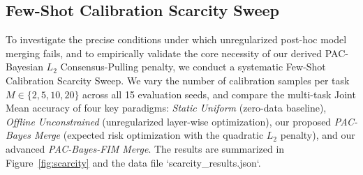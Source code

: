 \subsection{Few-Shot Calibration Scarcity Sweep}
\label{subsec:calibration_scarcity}
To investigate the precise conditions under which unregularized post-hoc model merging fails, and to empirically validate the core necessity of our derived PAC-Bayesian $L_2$ Consensus-Pulling penalty, we conduct a systematic Few-Shot Calibration Scarcity Sweep. We vary the number of calibration samples per task $M \in \{2, 5, 10, 20\}$ across all 15 evaluation seeds, and compare the multi-task Joint Mean accuracy of four key paradigms: \emph{Static Uniform} (zero-data baseline), \emph{Offline Unconstrained} (unregularized layer-wise optimization), our proposed \emph{PAC-Bayes Merge} (expected risk optimization with the quadratic $L_2$ penalty), and our advanced \emph{PAC-Bayes-FIM Merge}. The results are summarized in Figure~\ref{fig:scarcity} and the data file `scarcity\_results.json`.

